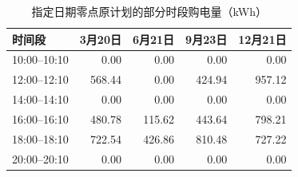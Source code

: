 \begin{table}[!htbp]
\centering
\caption{指定日期零点原计划的部分时段购电量（kWh）}
\label{tab:q3_original_order}
\small
\setlength{\tabcolsep}{5pt}
\begin{tabular}{lrrrr}
\toprule
时间段 & 3月20日 & 6月21日 & 9月23日 & 12月21日 \\
\midrule
10:00--10:10 & 0.00 & 0.00 & 0.00 & 0.00 \\
12:00--12:10 & 568.44 & 0.00 & 424.94 & 957.12 \\
14:00--14:10 & 0.00 & 0.00 & 0.00 & 0.00 \\
16:00--16:10 & 480.78 & 115.62 & 443.64 & 798.21 \\
18:00--18:10 & 722.54 & 426.86 & 810.48 & 727.22 \\
20:00--20:10 & 0.00 & 0.00 & 0.00 & 0.00 \\
\bottomrule
\end{tabular}
\end{table}
